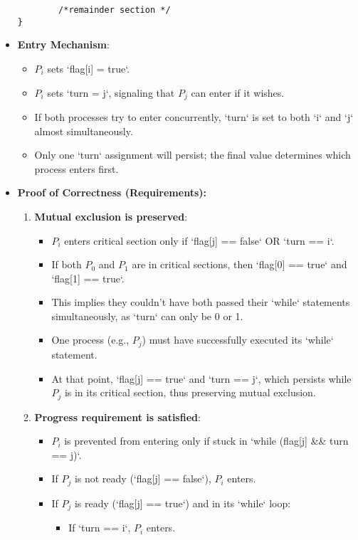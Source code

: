 \begin{itemize}
\begin{verbatim}
        /*remainder section */
}
\end{verbatim}
    \item \textbf{Entry Mechanism}:
    \begin{itemize}
        \item $P_i$ sets `flag[i] = true`.
        \item $P_i$ sets `turn = j`, signaling that $P_j$ can enter if it wishes.
        \item If both processes try to enter concurrently, `turn` is set to both `i` and `j` almost simultaneously.
        \item Only one `turn` assignment will persist; the final value determines which process enters first.
    \end{itemize}
    \item \textbf{Proof of Correctness (Requirements):}
    \begin{enumerate}
        \item \textbf{Mutual exclusion is preserved}:
        \begin{itemize}
            \item $P_i$ enters critical section only if `flag[j] == false` OR `turn == i`.
            \item If both $P_0$ and $P_1$ are in critical sections, then `flag[0] == true` and `flag[1] == true`.
            \item This implies they couldn't have both passed their `while` statements simultaneously, as `turn` can only be 0 or 1.
            \item One process (e.g., $P_j$) must have successfully executed its `while` statement.
            \item At that point, `flag[j] == true` and `turn == j`, which persists while $P_j$ is in its critical section, thus preserving mutual exclusion.
        \end{itemize}
        \item \textbf{Progress requirement is satisfied}:
        \begin{itemize}
            \item $P_i$ is prevented from entering only if stuck in `while (flag[j] \&\& turn == j)`.
            \item If $P_j$ is not ready (`flag[j] == false`), $P_i$ enters.
            \item If $P_j$ is ready (`flag[j] == true`) and in its `while` loop:
            \begin{itemize}
                \item If `turn == i`, $P_i$ enters.

\end{itemize}
\end{itemize}
\end{enumerate}
\end{itemize}

